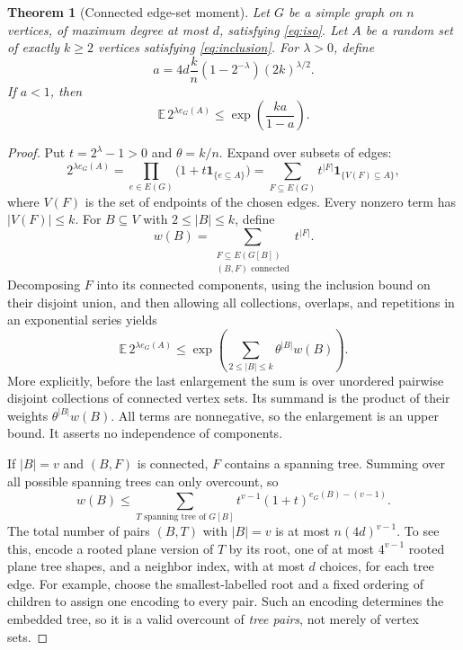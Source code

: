 \documentclass[11pt]{article}
\numberwithin{equation}{section}
\newtheorem{theorem}{Theorem}[section]
\theoremstyle{definition}\newtheorem{definition}[theorem]{Definition}
\theoremstyle{remark}\newtheorem{remark}[theorem]{Remark}
\newcommand{\E}{\mathbb E}
\newcommand{\ind}{\mathbf 1}
\begin{document}
\begin{theorem}[Connected edge-set moment]\label{thm:moment}
Let $G$ be a simple graph on $n$ vertices, of maximum degree at most $d$,
satisfying \eqref{eq:iso}. Let $A$ be a random set of exactly $k\ge2$ vertices
satisfying \eqref{eq:inclusion}. For $\lambda>0$, define
\begin{equation}\label{eq:a}
 a=4d\frac{k}{n}(1-2^{-\lambda})(2k)^{\lambda/2}.
\end{equation}
If $a<1$, then
\begin{equation}\label{eq:moment}
 \E\,2^{\lambda e_G(A)}\le
 \exp\!\left(\frac{ka}{1-a}\right).
\end{equation}
\end{theorem}
\begin{proof}
Put $t=2^\lambda-1>0$ and $\theta=k/n$. Expand over subsets of edges:
\begin{equation}\label{eq:edge-expansion}
 2^{\lambda e_G(A)}
 =\prod_{e\in E(G)}\bigl(1+t\ind_{\{e\subseteq A\}}\bigr)
 =\sum_{F\subseteq E(G)}t^{|F|}\ind_{\{V(F)\subseteq A\}},
\end{equation}
where $V(F)$ is the set of endpoints of the chosen edges. Every nonzero term
has $|V(F)|\le k$. For $B\subseteq V$ with $2\le |B|\le k$, define
\[
 w(B)=\sum_{\substack{F\subseteq E(G[B])\\(B,F)\text{ connected}}}t^{|F|}.
\]
Decomposing $F$ into its connected components, using the inclusion bound
on their disjoint union, and then allowing all collections, overlaps, and
repetitions in an exponential series yields
\begin{equation}\label{eq:component-sum}
 \E\,2^{\lambda e_G(A)}
 \le\exp\!\left(\sum_{2\le|B|\le k}\theta^{|B|}w(B)\right).
\end{equation}
More explicitly, before the last enlargement the sum is over unordered
pairwise disjoint collections of connected vertex sets. Its summand is
the product of their weights $\theta^{|B|}w(B)$. All terms are nonnegative,
so the enlargement is an upper bound. It asserts no independence of
components.

If $|B|=v$ and $(B,F)$ is connected, $F$ contains a spanning tree. Summing
over all possible spanning trees can only overcount, so
\begin{equation}\label{eq:tree-overcount}
 w(B)\le\sum_{T\text{ spanning tree of }G[B]}
 t^{v-1}(1+t)^{e_G(B)-(v-1)}.
\end{equation}
The total number of pairs $(B,T)$ with $|B|=v$ is at most
$n(4d)^{v-1}$. To see this, encode a rooted plane version of $T$ by its root,
one of at most $4^{v-1}$ rooted plane tree shapes, and a neighbor index,
with at most $d$ choices, for each tree edge. For example, choose the
smallest-labelled root and a fixed ordering of children to assign one
encoding to every pair. Such an encoding determines the embedded tree,
so it is a valid overcount of \emph{tree pairs}, not merely of vertex sets.


\end{proof}
\end{document}
